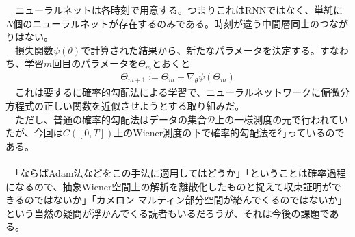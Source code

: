 \documentclass{jsarticle}
\begin{document}
　ニューラルネットは各時刻で用意する。つまりこれはRNNではなく、単純に$N$個のニューラルネットが存在するのみである。時刻が違う中間層同士のつながりはない。\\
　損失関数$\psi(\theta)$で計算された結果から、新たなパラメータを決定する。すなわち、学習$m$回目のパラメータを$\Theta_m$とおくと
\begin{eqnarray}
\Theta_{m+1}:=\Theta_{m}-\nabla_\theta\psi(\Theta_m)
\end{eqnarray}
　これは要するに確率的勾配法による学習で、ニューラルネットワークに偏微分方程式の正しい関数を近似させようとする取り組みだ。\\
　ただし、普通の確率的勾配法はデータの集合$\mathcal{D}$上の一様測度の元で行われていたが、今回は$C([0,T])$上のWiener測度の下で確率的勾配法を行っているのである。\\
　\\
　「ならばAdam法などをこの手法に適用してはどうか」「ということは確率過程になるので、抽象Wiener空間上の解析を離散化したものと捉えて収束証明ができるのではないか」「カメロン-マルティン部分空間が絡んでくるのではないか」という当然の疑問が浮かんでくる読者もいるだろうが、それは今後の課題である。

 
\newpage
\end{document}
